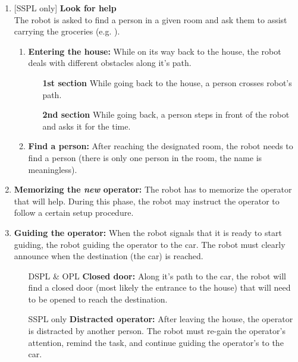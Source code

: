 \begin{enumerate}
  \setcounter{enumi}{\theenumTemp}
  \item {[SSPL only]} \textbf{Look for help} \\
  The robot is asked to find a person in a given room and ask them to assist carrying the groceries (e.g. ).
  \begin{enumerate}
    \item \textbf{Entering the house:} While on its way back to the house, the robot deals with different obstacles along it's path.
    \begin{itemize}[leftmargin=3cm]
      \item[\textbf{1st section}] While going back to the house, a person crosses robot's path.
      \item[\textbf{2nd section}] While going back, a person steps in front of the robot and asks it for the time.
    \end{itemize}

    \item \textbf{Find a person:} After reaching the designated room, the robot needs to find a person (there is only one person in the room, the name is meaningless).
  \end{enumerate}

  \item \textbf{Memorizing the \emph{new} operator:} The robot has to memorize the operator that will help. During this phase, the robot may instruct the operator to follow a certain setup procedure.

  \item \textbf{Guiding the operator:} When the robot signals that it is ready to start guiding, the robot guiding the operator to the car. The robot must clearly announce when the destination (the car) is reached.
  \begin{itemize}[leftmargin=3cm]
    \item[DSPL \& OPL] \textbf{Closed door:} Along it's path to the car, the robot will find a closed door (most likely the entrance to the house) that will need to be opened to reach the destination.
    \item[SSPL only] \textbf{Distracted operator:} After leaving the house, the operator is distracted by another person. The robot must re-gain the operator's attention, remind the task, and continue guiding the operator's to the car.
  \end{itemize}

\end{enumerate}

